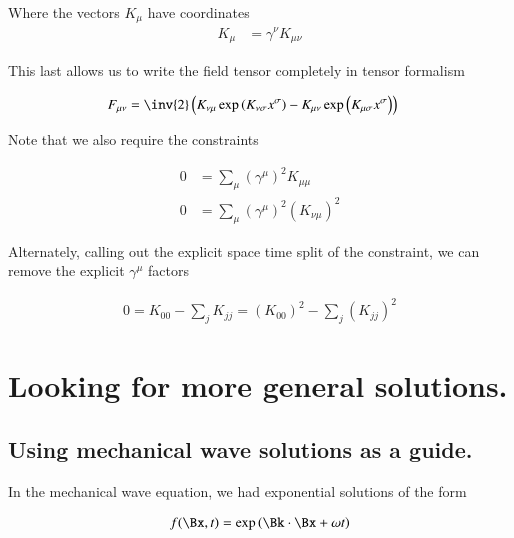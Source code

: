 Where the vectors $K_\mu$ have coordinates
\begin{align}\label{eqn:em_wave:WorkingSolutionDefinitions}
K_\mu &= \gamma^\nu K_{\mu\nu} 
\end{align}

This last allows us to write the field tensor completely in tensor formalism

\begin{align*}
F_{\mu\nu} &= \inv{2} \left( K_{\nu\mu} \exp\left( K_{\nu\sigma} x^\sigma \right) - K_{\mu\nu} \exp\left( K_{\mu\sigma} x^\sigma \right) \right)
\end{align*}

Note that we also require the constraints

\begin{align}\label{eqn:em_wave:WorkingSolutionConstraints}
0 &= \sum_\mu (\gamma^\mu)^2 K_{\mu\mu} \\
0 &= \sum_\mu (\gamma^\mu)^2 (K_{\nu\mu})^2
\end{align}

Alternately, calling out the explicit space time split of the constraint, we can
remove the explicit $\gamma^\mu$ factors 

\begin{align*}
0 = K_{00} - \sum_j K_{jj} = (K_{00})^2 - \sum_j (K_{jj} )^2
\end{align*}

%
%

\section{Looking for more general solutions. }

\subsection{Using mechanical wave solutions as a guide. }

In the mechanical wave equation, we had exponential solutions of the form

\begin{align*}
f(\Bx,t) = \exp\left( \Bk \cdot \Bx + \omega t \right)
\end{align*}

